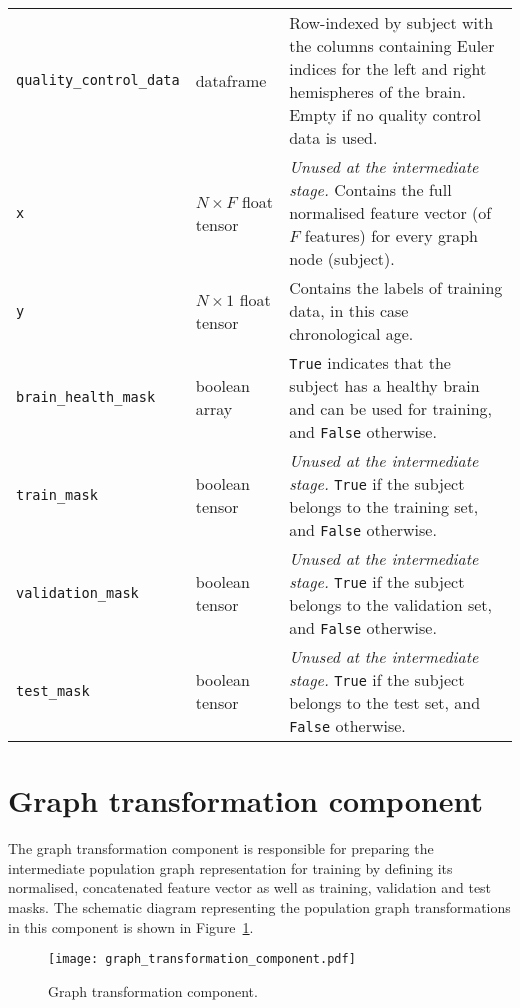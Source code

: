\begin{center}
\begin{longtable}[]{lp{}p{}}
    \texttt{quality\_control\_data} & dataframe & Row-indexed by subject with the columns containing Euler indices for the left and right hemispheres of the brain. Empty if no quality control data is used. \\
    \texttt{x} & $N \times F$ \hfill\newline float tensor & \textit{Unused at the intermediate stage.} Contains the full normalised feature vector (of $F$ features) for every graph node (subject). \\
    \texttt{y} & $N \times 1$ \hfill \newline float tensor & Contains the labels of training data, in this case chronological age. \\
    \texttt{brain\_health\_mask} & boolean array & \texttt{True} indicates that the subject has a healthy brain and can be used for training, and \texttt{False} otherwise. \\
    \texttt{train\_mask} & boolean tensor & \textit{Unused at the intermediate stage.} \texttt{True} if the subject belongs to the training set, and \texttt{False} otherwise. \\
    \texttt{validation\_mask} & boolean tensor & \textit{Unused at the intermediate stage.} \texttt{True} if the subject belongs to the validation set, and \texttt{False} otherwise. \\
    \texttt{test\_mask} & boolean tensor & \textit{Unused at the intermediate stage.} \texttt{True} if the subject belongs to the test set, and \texttt{False} otherwise.
\end{longtable}
\end{center}

\section{Graph transformation component}
\label{section:graph-transformation}

The graph transformation component is responsible for preparing the intermediate population graph representation for training by defining its normalised, concatenated feature vector as well as training, validation and test masks. The schematic diagram representing the population graph transformations in this component is shown in Figure~\ref{graph-transformation-component}.

\begin{figure}[h]
    \centering
    \texttt{[image: graph\_transformation\_component.pdf]}
    \caption{Graph transformation component.}\label{graph-transformation-component}
\end{figure}


